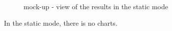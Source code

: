 \documentclass[a4paper,11pt]{report}
\begin{document}
\begin{figure}[H]
\begin{center}
\caption{mock-up - view of the results in the static mode}
\end{center}
\end{figure}
In the static mode, there is no charts.
\vspace*{\fill}
\newpage
\end{document}
